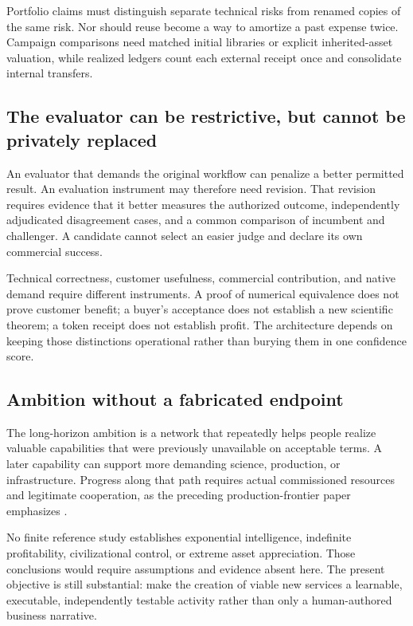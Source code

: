 \documentclass[11pt,letterpaper]{article}
\theoremstyle{remark}\newtheorem{remark}{Remark}[section]
\begin{document}
Portfolio claims must distinguish separate technical risks from renamed copies of the same risk. Nor should reuse become a way to amortize a past expense twice. Campaign comparisons need matched initial libraries or explicit inherited-asset valuation, while realized ledgers count each external receipt once and consolidate internal transfers.

\subsection{The evaluator can be restrictive, but cannot be privately replaced}
An evaluator that demands the original workflow can penalize a better permitted result. An evaluation instrument may therefore need revision. That revision requires evidence that it better measures the authorized outcome, independently adjudicated disagreement cases, and a common comparison of incumbent and challenger. A candidate cannot select an easier judge and declare its own commercial success.

Technical correctness, customer usefulness, commercial contribution, and native demand require different instruments. A proof of numerical equivalence does not prove customer benefit; a buyer's acceptance does not establish a new scientific theorem; a token receipt does not establish profit. The architecture depends on keeping those distinctions operational rather than burying them in one confidence score.

\subsection{Ambition without a fabricated endpoint}
The long-horizon ambition is a network that repeatedly helps people realize valuable capabilities that were previously unavailable on acceptable terms. A later capability can support more demanding science, production, or infrastructure. Progress along that path requires actual commissioned resources and legitimate cooperation, as the preceding production-frontier paper emphasizes \citep{boucherProduction}.

No finite reference study establishes exponential intelligence, indefinite profitability, civilizational control, or extreme asset appreciation. Those conclusions would require assumptions and evidence absent here. The present objective is still substantial: make the creation of viable new services a learnable, executable, independently testable activity rather than only a human-authored business narrative.
\end{document}
